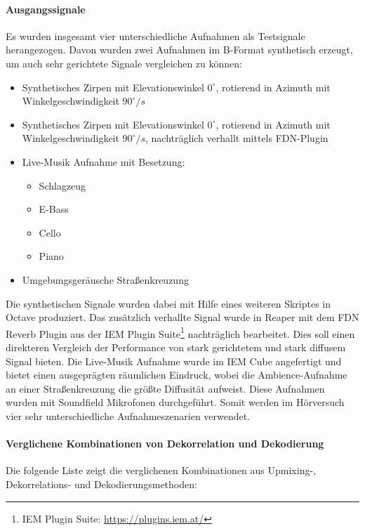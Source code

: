 \paragraph{Ausgangssignale}
Es wurden insgesamt vier unterschiedliche Aufnahmen als Testsignale herangezogen. Davon wurden zwei Aufnahmen im B-Format synthetisch erzeugt, um auch sehr gerichtete Signale vergleichen zu können:

\begin{itemize}
	\item Synthetisches Zirpen mit Elevationswinkel $0^{\circ}$, rotierend in Azimuth mit Winkelgeschwindigkeit $90^{\circ}/s$
	\item Synthetisches Zirpen mit Elevationswinkel $0^{\circ}$, rotierend in Azimuth mit Winkelgeschwindigkeit $90^{\circ}/s$, nachträglich verhallt mittels FDN-Plugin
	\item Live-Musik Aufnahme mit Besetzung:
	\begin{itemize}
	  \item Schlagzeug
	  \item E-Bass
	  \item Cello
	  \item Piano
	\end{itemize}
	\item Umgebungsgeräusche Straßenkreuzung
\end{itemize}

Die synthetischen Signale wurden dabei mit Hilfe eines weiteren Skriptes in Octave produziert. Das zusätzlich verhallte Signal wurde in Reaper mit dem FDN Reverb Plugin aus der IEM Plugin Suite\footnote{IEM Plugin Suite: \url{https://plugins.iem.at/}} nachträglich bearbeitet. Dies soll einen direkteren Vergleich der Performance von stark gerichtetem und stark diffusem Signal bieten. Die Live-Musik Aufnahme wurde im IEM Cube angefertigt und bietet einen ausgeprägten räumlichen Eindruck, wobei die Ambience-Aufnahme an einer Straßenkreuzung die größte Diffusität aufweist. Diese Aufnahmen wurden mit Soundfield Mikrofonen durchgeführt. Somit werden im Hörversuch vier sehr unterschiedliche Aufnahmeszenarien verwendet.


\paragraph{Verglichene Kombinationen von Dekorrelation und Dekodierung}

Die folgende Liste zeigt die verglichenen Kombinationen aus Upmixing-, Dekorrelations- und Dekodierungsmethoden:

